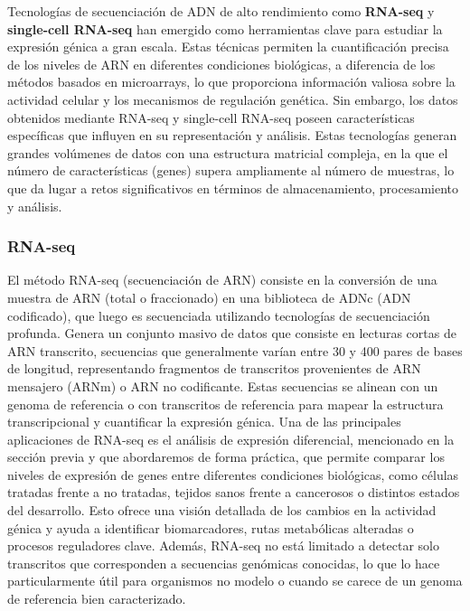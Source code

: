 Tecnologías de secuenciación de ADN de alto rendimiento como \textbf{RNA-seq} y \textbf{single-cell RNA-seq} han emergido como herramientas 
clave para estudiar la expresión génica a gran escala. Estas técnicas permiten la cuantificación precisa de los niveles de ARN en diferentes 
condiciones biológicas, a diferencia de los métodos basados en microarrays, lo que proporciona información valiosa sobre la actividad celular 
y los mecanismos de regulación genética. Sin embargo, los datos obtenidos mediante RNA-seq y single-cell RNA-seq poseen características 
específicas que influyen en su representación y análisis. Estas tecnologías generan grandes volúmenes de datos con una estructura 
matricial compleja, en la que el número de características (genes) supera ampliamente al número de muestras, lo que da lugar a retos 
significativos en términos de almacenamiento, procesamiento y análisis.

\subsubsection{RNA-seq}

El método RNA-seq (secuenciación de ARN) consiste en la conversión de una muestra de ARN (total o fraccionado) en una biblioteca de ADNc 
(ADN codificado), que luego es secuenciada utilizando tecnologías de secuenciación profunda. Genera un conjunto masivo de datos que consiste 
en lecturas cortas de ARN transcrito, secuencias que generalmente varían entre 30 y 400 pares de bases de longitud, representando fragmentos 
de transcritos provenientes de ARN mensajero (ARNm) o ARN no codificante. Estas secuencias se alinean con un genoma de referencia o con 
transcritos de referencia para mapear la estructura transcripcional y cuantificar la expresión génica. Una de las principales aplicaciones 
de RNA-seq es el análisis de expresión diferencial, mencionado en la sección previa y que abordaremos de forma práctica, que permite comparar 
los niveles de expresión de genes entre diferentes condiciones 
biológicas, como células tratadas frente a no tratadas, tejidos sanos frente a cancerosos o distintos estados del desarrollo. Esto ofrece 
una visión detallada de los cambios en la actividad génica y ayuda a identificar biomarcadores, rutas metabólicas alteradas o procesos 
reguladores clave. Además, RNA-seq no está limitado a detectar solo transcritos que corresponden a secuencias genómicas conocidas, 
lo que lo hace particularmente útil para organismos no modelo o cuando se carece de un genoma de referencia bien caracterizado. \newline

